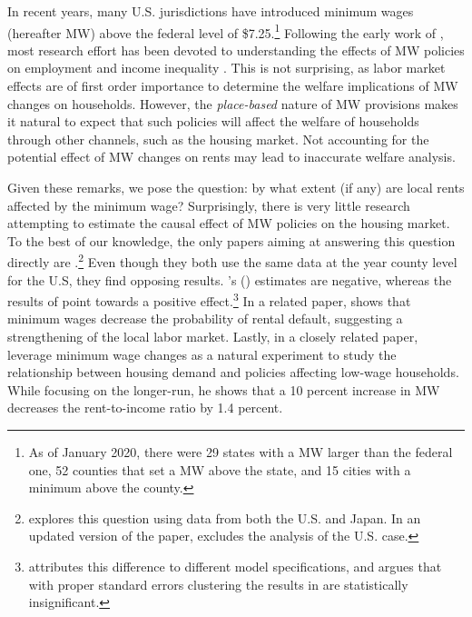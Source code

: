
In recent years, many U.S. jurisdictions have introduced minimum wages (hereafter MW) above 
the federal level of \$7.25.\footnote{As of January 2020, there were 29 states with a MW 
	larger 	than the federal one, 52 counties that set a MW above the state, and 15 cities 
	with a minimum above the county.} %
Following the early work of \textcite{CardKrueger2000}, most research effort has been devoted 
to understanding the effects of MW policies on employment \parencite[e.g.,][]{Neumark2006, 
DubeEtAl2010, MeerWest2016, CegnizEtAl2019} and income inequality \parencite{Lee1999, 
AutorEtAl2016}. This is not surprising, as labor market effects are of first order importance 
to determine the welfare implications of MW changes on households. However, the 
\textit{place-based} nature of MW provisions makes it natural to expect that such policies 
will affect the welfare of households through other channels, such as the housing market.
Not accounting for the potential effect of MW changes on rents may lead to inaccurate 
welfare analysis.

Given these remarks, we pose the question: by what extent (if any) are local rents affected 
by the minimum wage? Surprisingly, there is very little research attempting to estimate 
the causal effect of MW policies on the housing market. To the best of our knowledge, the 
only papers aiming at answering this question directly are \textcite{Tidemann2018, Yamagishi2019, 
Yamagishi2020}.\footnote{\textcite{Yamagishi2019} explores this question using data from both 
	the U.S. and Japan. In an updated version of the paper, \textcite{Yamagishi2020} excludes 
	the analysis of the U.S. case.}
Even though they both use the same data at the year county level for the U.S, they find opposing 
results. \citeauthor{Tidemann2018}'s (\citeyear{Tidemann2018}) estimates are negative, whereas 
the results of \textcite{Yamagishi2019} point towards a positive effect.\footnote{
	\textcite{Yamagishi2019} attributes this difference to different model 
	specifications, and argues that with proper standard errors clustering the results in 
	\textcite{Tidemann2018} are statistically insignificant.} 
In a related paper, \textcite{AgarwalEtAl2019} shows that minimum wages decrease 
the probability of rental default, suggesting a strengthening of the local labor market. 
Lastly, in a closely related paper, \textcite{hughes2020housing} leverage minimum wage
changes as a natural experiment to study the relationship between housing demand and policies 
affecting low-wage households. While focusing on the longer-run, he shows that a 10 percent 
increase in MW decreases the rent-to-income ratio by 1.4 percent. 

